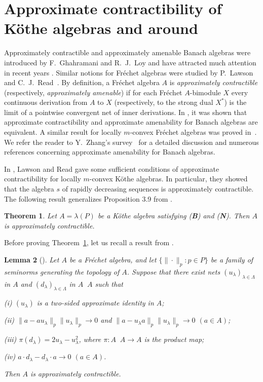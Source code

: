 \documentclass[12pt,reqno]{amsart}
\newtheorem{theorem}{Theorem}[section]
\newtheorem{lemma}[theorem]{Lemma}
\theoremstyle{definition}
\begin{document}
\section{Approximate contractibility of K\"othe algebras and around}
Approximately contractible and approximately amenable Banach algebras were introduced
by F.~Ghahramani and R.~J.~Loy \cite{GL_genamen} and have attracted much attention
in recent years \cite{DLZ,GLZ_genamen2,GS,CGZ,CG}. Similar notions for Fr\'echet algebras were
studied by P.~Lawson and C.~J.~Read~\cite{LR}. By definition, a Fr\'echet algebra
$A$ is {\em approximately contractible} (respectively, {\em approximately amenable})
if for each Fr\'echet $A$-bimodule $X$ every continuous derivation from
$A$ to $X$ (respectively, to the strong dual $X^*$) is the limit of a pointwise
convergent net of inner derivations. In \cite{GLZ_genamen2}, it was shown that
approximate contractibility and approximate amenability for Banach algebras
are equivalent. A similar result for locally $m$-convex Fr\'echet algebras
was proved in~\cite{LR}. We refer the reader to Y.~Zhang's survey~\cite{Zhang_slides}
for a detailed discussion and numerous references concerning
approximate amenability for Banach algebras.

In \cite{LR}, Lawson and Read gave some sufficient conditions of approximate
contractibility for locally $m$-convex K\"othe algebras. In particular, they
showed that the algebra $s$ of rapidly decreasing sequences is approximately
contractible. The following result generalizes Proposition 3.9 from \cite{LR}.

\begin{theorem}
\label{thm:BN_appr}
Let $A=\lambda(P)$ be a K\"othe algebra satisfying {\upshape ({\textbf{B}})} and
{\upshape ({\textbf{N}})}. Then $A$ is approximately contractible.
\end{theorem}

Before proving Theorem~\ref{thm:BN_appr}, let us recall a result from \cite{LR}.

\begin{lemma}[{\cite[Lemma 2.7]{LR}}]
\label{lemma:LR}
Let $A$ be a Fr\'echet algebra, and let $\{ \|\cdot\|_p : p\in P\}$ be a family
of seminorms generating the topology of $A$. Suppose that there exist nets
$(u_\lambda)_{\lambda\in\Lambda}$ in $A$ and $(d_\lambda)_{\lambda\in\Lambda}$
in $A{\mathop{\widehat\otimes}} A$ such that
\begin{compactenum}
\item[{\upshape (i)}] $(u_\lambda)$ is a two-sided approximate identity in $A$;
\item[{\upshape (ii)}] $\| a-au_\lambda\|_p \| u_\lambda\|_p\to 0$
and $\| a-u_\lambda a\|_p \| u_\lambda\|_p\to 0$ \qquad $(a\in A)$;
\item[{\upshape (iii)}] $\pi(d_\lambda)=2u_\lambda-u_\lambda^2$, where
$\pi\colon A{\mathop{\widehat\otimes}} A\to A$ is the product map;
\item[{\upshape (iv)}] $a\cdot d_\lambda-d_\lambda\cdot a\to 0$ \qquad $(a\in A)$.
\end{compactenum}
Then $A$ is approximately contractible.
\end{lemma}
\end{document}

